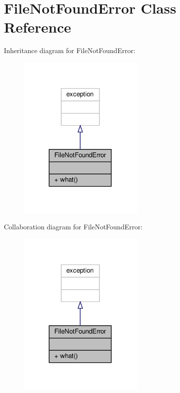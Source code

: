 \hypertarget{classFileNotFoundError}{}\section{File\+Not\+Found\+Error Class Reference}
\label{classFileNotFoundError}


Inheritance diagram for File\+Not\+Found\+Error\+:\nopagebreak
\begin{figure}[H]
\begin{center}
\leavevmode
\includegraphics[width=176pt]{classFileNotFoundError__inherit__graph}
\end{center}
\end{figure}


Collaboration diagram for File\+Not\+Found\+Error\+:\nopagebreak
\begin{figure}[H]
\begin{center}
\leavevmode
\includegraphics[width=176pt]{classFileNotFoundError__coll__graph}
\end{center}
\end{figure}
